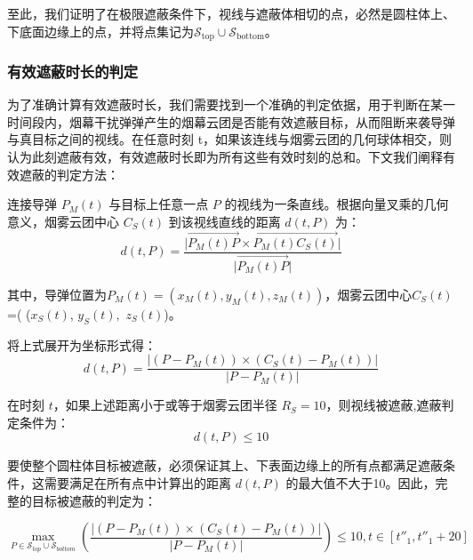 \documentclass[withoutpreface,bwprint]{cumcmthesis}
\numberwithin{equation}{section} %
\numberwithin{figure}{section} %
\numberwithin{table}{section}  %
\begin{document}
\vspace{1em}

至此，我们证明了在极限遮蔽条件下，视线与遮蔽体相切的点，必然是圆柱体上、下底面边缘上的点，并将点集记为$\mathcal{S}_{\text{top}} \cup \mathcal{S}_{\text{bottom}}$。

\subsubsection{有效遮蔽时长的判定}

为了准确计算有效遮蔽时长，我们需要找到一个准确的判定依据，用于判断在某一时间段内，烟幕干扰弹弹产生的烟幕云团是否能有效遮蔽目标，从而阻断来袭导弹与真目标之间的视线。在任意时刻 t，如果该连线与烟雾云团的几何球体相交，则认为此刻遮蔽有效，有效遮蔽时长即为所有这些有效时刻的总和。下文我们阐释有效遮蔽的判定方法：

连接导弹 $P_M(t)$ 与目标上任意一点 $P$ 的视线为一条直线。根据向量叉乘的几何意义，烟雾云团中心 $C_S(t)$ 到该视线直线的距离 $d(t, P)$ 为：
\begin{equation}
    d(t, P) = \frac{\lvert  \overrightarrow{P_M(t)P} \times \overrightarrow{P_M(t)C_S(t)} \rvert}{\lvert \overrightarrow{P_M(t)P} \rvert}
\end{equation}

其中，导弹位置为$P_M(t) = (x_M(t), y_M(t), z_M(t))$，烟雾云团中心$C_S(t)$ =( ($x_S(t)$, $y_S(t),$ $z_S(t)$)。

将上式展开为坐标形式得：
\begin{equation}
    d(t, P) = \frac{\lvert (P - P_M(t)) \times (C_S(t) - P_M(t)) \rvert}{\lvert P - P_M(t) \rvert}
\end{equation}

在时刻 $t$，如果上述距离小于或等于烟雾云团半径 $R_S = 10$，则视线被遮蔽,遮蔽判定条件为：
\begin{equation}
    d(t, P) \le 10
\end{equation}

要使整个圆柱体目标被遮蔽，必须保证其上、下表面边缘上的所有点都满足遮蔽条件，这需要满足在所有点中计算出的距离 $d(t, P)$ 的最大值不大于10。因此，完整的目标被遮蔽的判定为：

\begin{equation}
    \max_{P \in \mathcal{S}_{top} \cup \mathcal{S}_{bottom}} \left( \frac{\lvert (P - P_M(t)) \times (C_S(t) - P_M(t)) \rvert}{\lvert P - P_M(t) \rvert} \right) \le 10,t \in [t''_1, t''_1 + 20]
\end{equation}

\end{document}
